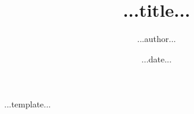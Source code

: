 \documentclass[11pt]{article}
\title{\textbf{...title...}}
\author{...author...}
\date{...date...}
\begin{document}
    \maketitle

    ...template...
\end{document}
